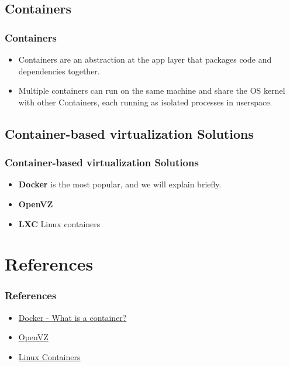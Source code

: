 \subsection{Containers}
\begin{frame}
	\frametitle{Containers}
	\begin{itemize}
		\item Containers are an abstraction at the app layer that packages code and dependencies together.
		\item Multiple containers can run on the same machine and share the OS kernel with other Containers, each running as isolated processes in userspace.
	\end{itemize}
\end{frame}

\subsection{Container-based virtualization Solutions}
\begin{frame}
	\frametitle{Container-based virtualization Solutions}
	\begin{itemize}
		\item \textbf{Docker} is the most popular, and we will explain briefly.
		\item \textbf{OpenVZ}
		\item \textbf{LXC} Linux containers 
	\end{itemize}
\end{frame}

\section{References}
\begin{frame}
	\frametitle{References}
	\begin{itemize}
		\item \href{https://www.docker.com/resources/what-container}{Docker - What is a container?}
		\item \href{https://openvz.org/}{OpenVZ}
		\item \href{https://linuxcontainers.org/}{Linux Containers}
	\end{itemize}
\end{frame}
